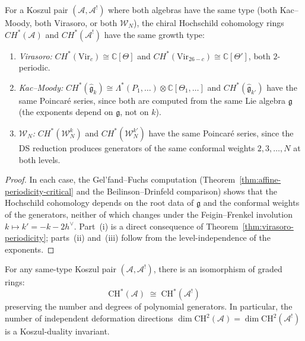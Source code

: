 \begin{proposition}
\label{prop:periodicity-same-type}
For a Koszul pair $(\mathcal{A}, \mathcal{A}^!)$ where both algebras have the same type \textup{(}both Kac--Moody, both Virasoro, or both $\mathcal{W}_N$\textup{)}, the chiral Hochschild cohomology rings $CH^*(\mathcal{A})$ and $CH^*(\mathcal{A}^!)$ have the same growth type:
\begin{enumerate}[label=\textup{(\roman*)}]
\item \emph{Virasoro:} $CH^*(\mathrm{Vir}_c) \cong \mathbb{C}[\Theta]$ and $CH^*(\mathrm{Vir}_{26-c}) \cong \mathbb{C}[\Theta']$, both $2$-periodic.
\item \emph{Kac--Moody:} $CH^*(\widehat{\mathfrak{g}}_k) \cong \Lambda^*(P_1, \ldots) \otimes \mathbb{C}[\Theta_1, \ldots]$ and $CH^*(\widehat{\mathfrak{g}}_{k'})$ have the same Poincar\'e series, since both are computed from the same Lie algebra $\mathfrak{g}$ \textup{(}the exponents depend on $\mathfrak{g}$, not on $k$\textup{)}.
\item \emph{$\mathcal{W}_N$:} $CH^*(\mathcal{W}_N^k)$ and $CH^*(\mathcal{W}_N^{k'})$ have the same Poincar\'e series, since the DS reduction produces generators of the same conformal weights $2, 3, \ldots, N$ at both levels.
\end{enumerate}
\end{proposition}

\begin{proof}
In each case, the Gel'fand--Fuchs computation (Theorem~\ref{thm:affine-periodicity-critical} and the Beilinson--Drinfeld comparison) shows that the Hochschild cohomology depends on the root data of $\mathfrak{g}$ and the conformal weights of the generators, neither of which changes under the Feigin--Frenkel involution $k \mapsto k' = -k - 2h^\vee$.  Part~(i) is a direct consequence of Theorem~\ref{thm:virasoro-periodicity}; parts~(ii) and~(iii) follow from the level-independence of the exponents.
\end{proof}

\begin{corollary}
\label{cor:hochschild-ring-koszul}
For any same-type Koszul pair $(\mathcal{A}, \mathcal{A}^!)$, there is
an isomorphism of graded rings:
\begin{equation}\label{eq:ch-koszul-iso}
\mathrm{CH}^*(\mathcal{A}) \;\cong\; \mathrm{CH}^*(\mathcal{A}^!)
\end{equation}
preserving the number and degrees of polynomial generators.
In particular, the number of independent deformation directions
$\dim \mathrm{CH}^2(\mathcal{A}) = \dim \mathrm{CH}^2(\mathcal{A}^!)$
is a Koszul-duality invariant.
\end{corollary}

